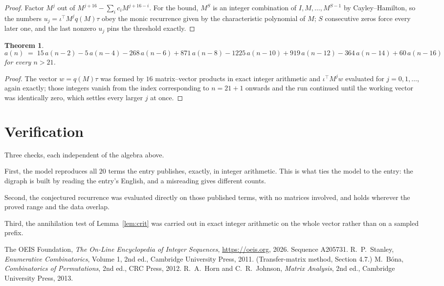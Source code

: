 \documentclass[11pt,a4paper]{article}
\theoremstyle{plain}
\newtheorem{theorem}{Theorem}
\theoremstyle{definition}
\begin{document}
\begin{proof}
Factor $M^{j}$ out of $M^{j+16}-\sum_ic_iM^{j+16-i}$. For the bound, $M^{S}$
is an integer combination of $I,M,\dots,M^{S-1}$ by Cayley--Hamilton, so the numbers
$u_j=\iota^{\!\top}M^{j}q(M)\tau$ obey the monic recurrence given by the characteristic
polynomial of $M$; $S$ consecutive zeros force every later one, and the last nonzero $u_j$
pins the threshold exactly.
\end{proof}

\begin{theorem}
\[
a(n)\;=\;15\,a(n-2) - 5\,a(n-4) - 268\,a(n-6) + 871\,a(n-8) - 1225\,a(n-10) + 919\,a(n-12) - 364\,a(n-14) + 60\,a(n-16)
\]
for every $n>21$.
\end{theorem}

\begin{proof}
The vector $w=q(M)\tau$ was formed by $16$ matrix--vector products in exact integer
arithmetic and $\iota^{\!\top}M^{j}w$ evaluated for $j=0,1,\dots$, again exactly; those
integers vanish from the index corresponding to $n=21+1$ onwards and the run continued
until the working vector was identically zero, which settles every larger $j$ at once.
\end{proof}

\section{Verification}

Three checks, each independent of the algebra above.

First, the model reproduces all $20$ terms the entry publishes, exactly, in integer
arithmetic. This is what ties the model to the entry: the digraph is built by reading the
entry's English, and a misreading gives different counts.

Second, the conjectured recurrence was evaluated directly on those published terms, with no
matrices involved, and holds wherever the proved range and the data overlap.

Third, the annihilation test of Lemma~\ref{lem:crit} was carried out in exact integer
arithmetic on the whole vector rather than on a sampled prefix.

\begin{thebibliography}{9}
 The OEIS Foundation, \emph{The On-Line Encyclopedia of Integer
Sequences}, \url{https://oeis.org}, 2026. Sequence A205731.
 R.~P.~Stanley, \emph{Enumerative Combinatorics}, Volume 1, 2nd ed.,
Cambridge University Press, 2011. (Transfer-matrix method, Section 4.7.)
 M.~B\'ona, \emph{Combinatorics of Permutations}, 2nd ed., CRC
Press, 2012.
 R.~A.~Horn and C.~R.~Johnson, \emph{Matrix Analysis}, 2nd ed., Cambridge
University Press, 2013.
\end{thebibliography}
\end{document}
